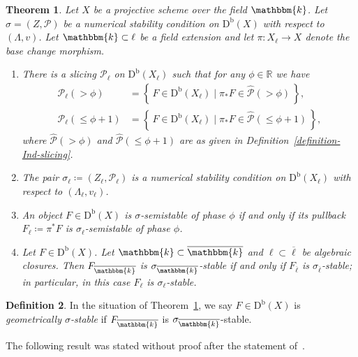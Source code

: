 \documentclass[11pt, reqno]{amsart}
\numberwithin{equation}{section}
\theoremstyle{plain}
\newtheorem{theorem}{Theorem}[section]
\theoremstyle{remark}
\theoremstyle{definition}
\newtheorem{definition}[theorem]{Definition}
\theoremstyle{italicsname}
\newcommand{\st}{\mid}
\newcommand{\set}[1]{\left\{ \, #1 \, \right\}}
\newcommand{\Db}{\mathrm{D^b}}
\newcommand{\cP}{\mathscr{P}}
\newcommand{\KK}{\mathbbm{k}}
\def\RR{\ensuremath{\mathbb{R}}}
\begin{document}
\begin{theorem}\label{thm:base-change-stab}
Let $X$ be a projective scheme over the field $\KK$. 
Let $\sigma=(Z,\cP)$ be a numerical stability condition on $\Db(X)$ with respect to $(\Lambda,v)$. Let $\KK \subset \ell$ be a field extension and let $\pi\colon X_{\ell}\to X$ denote the base change morphism.
\begin{enumerate}[{\rm (1)}]
\item\label{enum:base-change-stab1} 
There is a slicing $\cP_{\ell}$ on $\Db(X_{\ell})$ such that for any $\phi \in \RR$ we have 
\begin{align*}
    \cP_{\ell}(> \phi) & = \set{ F \in \Db(X_{\ell}) \st  \pi_*F \in \widehat{\cP}(> \phi)}, \\ 
    \cP_{\ell}(\leq \phi+1) & = \set{ F \in \Db(X_{\ell}) \st \pi_*F \in \widehat{\cP}(\leq \phi + 1)}, 
\end{align*}
where $\widehat{\cP}(> \phi)$ and $\widehat{\cP}(\leq \phi + 1)$ are as given in Definition~\ref{definition-Ind-slicing}. 
\item\label{enum:base-change-stab2} The pair $\sigma_{\ell}\coloneqq (Z_{\ell}, \cP_{\ell}) $ is a numerical stability condition on $\Db(X_{\ell})$ with respect to $(\Lambda_{\ell}, v_{\ell})$.
\item\label{enum:base-change-stab3} An object $F\in \Db(X)$ is $\sigma$-semistable of phase $\phi$ if and only if its pullback $F_{\ell}\coloneqq\pi^*F$ is $\sigma_{\ell}$-semistable of phase $\phi$. 
\item\label{enum:base-change-stab4} Let $F\in \Db(X)$. Let $\KK \subset \overline{\KK}$ and $\ell \subset \overline{\ell}$ be algebraic closures. 
Then $F_{\overline{\KK}}$ is $\sigma_{\overline{\KK}}$-stable if and only if $F_{\overline{\ell}}$ is $\sigma_{\overline{\ell}}$-stable; in particular, in this case $F_{\ell}$ is $\sigma_{\ell}$-stable. 
\end{enumerate}
\end{theorem}

\begin{definition}
\label{definition-geometrically-stable}
In the situation of Theorem~\ref{thm:base-change-stab}, we say $F\in \Db(X)$ is \emph{geometrically $\sigma$-stable} if $F_{\overline{\KK}}$ is $\sigma_{\overline{\KK}}$-stable.
\end{definition} 

 The following result was stated without proof  after the statement of~\cite[Theorem~12.17]{stability-families}.
\end{document}
